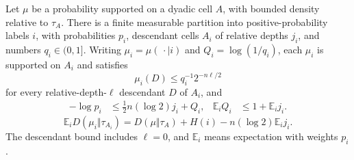 \begin{lemma}\label{l:bounded-split:decomposition}
Let \(\mu\) be a probability supported on a dyadic cell \(A\),
with bounded density relative to \(\tau_A\).  There is a finite
measurable partition into positive-probability labels \(i\), with
probabilities \(p_i\), descendant cells \(A_i\) of relative depths
\(j_i\), and numbers \(q_i\in(0,1]\).  Writing
\(\mu_i=\mu(\,\cdot\mid i)\) and \(Q_i=\log(1/q_i)\), each
\(\mu_i\) is supported on \(A_i\) and satisfies
\begin{equation}\label{l:bounded-split:spread}
 \mu_i(D)\le q_i^{-1}2^{-n\ell/2}
\end{equation}
for every relative-depth-\(\ell\) descendant \(D\) of \(A_i\), and
\begin{align}
 -\log p_i&\le\tfrac12n(\log2)j_i+Q_i,
 &\mathbb E_iQ_i&\le1+\mathbb E_i j_i.
 \label{l:bounded-split:label-cost}
\end{align}
\begin{equation}\label{l:bounded-split:entropy-identity}
 \mathbb E_iD(\mu_i\Vert\tau_{A_i})
 =D(\mu\Vert\tau_A)+H(i)-n(\log2)\mathbb E_i j_i.
\end{equation}
The descendant bound includes \(\ell=0\), and \(\mathbb E_i\)
means expectation with weights \(p_i\).
\end{lemma}

